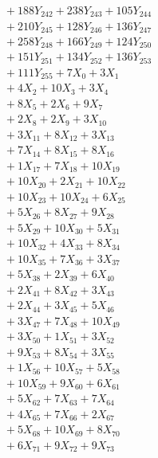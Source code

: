 \documentclass[a4paper,10pt]{article}
\begin{document}
{\begin{align}
&\;  + 188 Y_{242} + 238 Y_{243} + 105 Y_{244} \\[0.3ex]
&\;  + 210 Y_{245} + 128 Y_{246} + 136 Y_{247} \\[0.3ex]
&\;  + 258 Y_{248} + 166 Y_{249} + 124 Y_{250} \\[0.3ex]
&\;  + 151 Y_{251} + 134 Y_{252} + 136 Y_{253} \\[0.3ex]
&\;  + 111 Y_{255} + 7 X_{0} + 3 X_{1} \\[0.3ex]
&\;  + 4 X_{2} + 10 X_{3} + 3 X_{4} \\[0.3ex]
&\;  + 8 X_{5} + 2 X_{6} + 9 X_{7} \\[0.3ex]
&\;  + 2 X_{8} + 2 X_{9} + 3 X_{10} \\[0.3ex]
&\;  + 3 X_{11} + 8 X_{12} + 3 X_{13} \\[0.5ex]\allowbreak
&\;  + 7 X_{14} + 8 X_{15} + 8 X_{16} \\[0.3ex]
&\;  + 1 X_{17} + 7 X_{18} + 10 X_{19} \\[0.3ex]
&\;  + 10 X_{20} + 2 X_{21} + 10 X_{22} \\[0.3ex]
&\;  + 10 X_{23} + 10 X_{24} + 6 X_{25} \\[0.3ex]
&\;  + 5 X_{26} + 8 X_{27} + 9 X_{28} \\[0.3ex]
&\;  + 5 X_{29} + 10 X_{30} + 5 X_{31} \\[0.3ex]
&\;  + 10 X_{32} + 4 X_{33} + 8 X_{34} \\[0.3ex]
&\;  + 10 X_{35} + 7 X_{36} + 3 X_{37} \\[0.3ex]
&\;  + 5 X_{38} + 2 X_{39} + 6 X_{40} \\[0.3ex]
&\;  + 2 X_{41} + 8 X_{42} + 3 X_{43} \\[0.5ex]\allowbreak
&\;  + 2 X_{44} + 3 X_{45} + 5 X_{46} \\[0.3ex]
&\;  + 3 X_{47} + 7 X_{48} + 10 X_{49} \\[0.3ex]
&\;  + 3 X_{50} + 1 X_{51} + 3 X_{52} \\[0.3ex]
&\;  + 9 X_{53} + 8 X_{54} + 3 X_{55} \\[0.3ex]
&\;  + 1 X_{56} + 10 X_{57} + 5 X_{58} \\[0.3ex]
&\;  + 10 X_{59} + 9 X_{60} + 6 X_{61} \\[0.3ex]
&\;  + 5 X_{62} + 7 X_{63} + 7 X_{64} \\[0.3ex]
&\;  + 4 X_{65} + 7 X_{66} + 2 X_{67} \\[0.3ex]
&\;  + 5 X_{68} + 10 X_{69} + 8 X_{70} \\[0.3ex]
&\;  + 6 X_{71} + 9 X_{72} + 9 X_{73} \\[0.5ex]\allowbreak

\end{align}}
\end{document}
